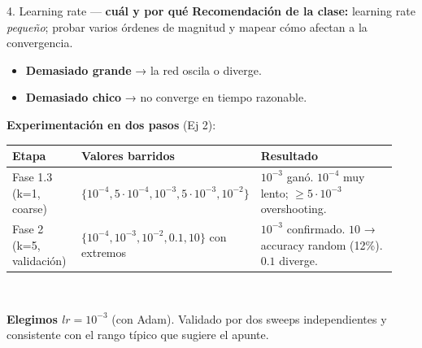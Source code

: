 \documentclass[11pt,aspectratio=169]{beamer}
\begin{document}
\begin{frame}{4. Learning rate — \textbf{cuál y por qué}}
\textbf{Recomendación de la clase:} learning rate \emph{pequeño}; probar varios órdenes de magnitud y mapear cómo afectan a la convergencia.\\[0.5em]

\begin{itemize}\setlength\itemsep{0.15em}\small
  \item \textbf{Demasiado grande} → la red oscila o diverge.
  \item \textbf{Demasiado chico} → no converge en tiempo razonable.
\end{itemize}
\vspace{0.6em}

\textbf{Experimentación en dos pasos} (Ej 2):\\[0.3em]

\centering\small
\begin{tabular}{@{}p{0.18\linewidth}p{0.40\linewidth}p{0.36\linewidth}@{}}
\toprule
\textbf{Etapa} & \textbf{Valores barridos} & \textbf{Resultado} \\
\midrule
Fase 1.3 (k=1, coarse)  & $\{10^{-4}, 5\!\cdot\!10^{-4}, 10^{-3}, 5\!\cdot\!10^{-3}, 10^{-2}\}$ & $10^{-3}$ ganó. $10^{-4}$ muy lento; $\geq 5\!\cdot\!10^{-3}$ overshooting. \\
\rowcolor{accent2!10}
Fase 2 (k=5, validación) & $\{10^{-4}, 10^{-3}, 10^{-2}, 0.1, 10\}$ con extremos & $10^{-3}$ confirmado. $10$ → accuracy random (12\%). $0.1$ diverge. \\
\bottomrule
\end{tabular}\\[0.6em]

\begin{takeaway}
\textbf{Elegimos $lr = 10^{-3}$} (con Adam). Validado por dos sweeps independientes y consistente con el rango típico que sugiere el apunte.
\end{takeaway}
\end{frame}
\end{document}

